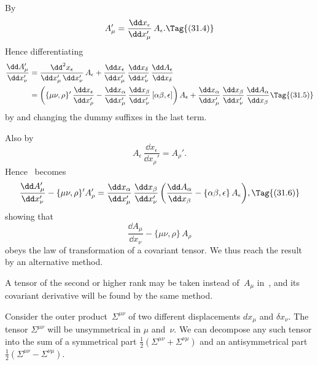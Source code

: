 \documentclass[12pt]{book}
\begin{document}
By~
\[
A_{\mu}' = \frac{\dd x_{\epsilon}}{\dd x_{\mu}'}\, A_{\epsilon}.
\Tag{(31.4)}
\]
Hence differentiating
\begin{align*}
  \frac{\dd A_{\mu}'}{\dd x_{\nu}'}
  &= \frac{\dd^{2} x_{\epsilon}}{\dd x_{\mu}'\, \dd x_{\nu}'}\, A_{\epsilon}
  + \frac{\dd x_{\epsilon}}{\dd x_{\mu}'}\,
    \frac{\dd x_{\delta}}{\dd x_{\nu}'}\,
    \frac{\dd A_{\epsilon}}{\dd x_{\delta}} \\
  &= \left(\{\mu\nu, \rho\}'\, \frac{\dd x_{\epsilon}}{\dd x_{\rho}'}
    - \frac{\dd x_{\alpha}}{\dd x_{\mu}'}\, \frac{\dd x_{\beta}}{\dd x_{\nu}'}\, [\alpha\beta, \epsilon]\right) A_{\epsilon}
    + \frac{\dd x_{\alpha}}{\dd x_{\mu}'}\, \frac{\dd x_{\beta}}{\dd x_{\nu}'}\, \frac{\dd A_{\alpha}}{\dd x_{\beta}}
\Tag{(31.5)}
\end{align*}
by  and changing the dummy suffixes in the last term.

Also by~
\[
A_{\epsilon}\, \frac{\dd x_{\epsilon}}{\dd x_{\rho}'} = A_{\rho}'.
\]
Hence ~becomes
\[
\frac{\dd A_{\mu}'}{\dd x_{\nu}'} - \{\mu\nu, \rho\}' A_{\rho}'
= \frac{\dd x_{\alpha}}{\dd x_{\mu}'}\, \frac{\dd x_{\beta}}{\dd x_{\nu}'} \left(\frac{\dd A_{\alpha}}{\dd x_{\beta}} - \{\alpha\beta, \epsilon\}\, A_{\epsilon}\right)\!,
\Tag{(31.6)}
\]
showing that
\[
\frac{\dd A_{\mu}}{\dd x_{\nu}} - \{\mu\nu, \rho\}\, A_{\rho}
\]
obeys the law of transformation of a covariant tensor. We thus reach the
result~ by an alternative method.

A tensor of the second or higher rank may be taken instead of~$A_{\mu}$ in~,
and its covariant derivative will be found by the same method.


{\Loosen Consider the outer product~$\Sigma^{\mu\nu}$ of two different displacements $dx_{\mu}$ and $\delta x_{\nu}$.
The tensor $\Sigma^{\mu\nu}$ will be unsymmetrical in $\mu$ and~$\nu$. We can decompose any
such tensor into the sum of a symmetrical part $\frac{1}{2}(\Sigma^{\mu\nu} + \Sigma^{\nu\mu})$ and an antisymmetrical
part $\frac{1}{2}(\Sigma^{\mu\nu} - \Sigma^{\nu\mu})$.}
\end{document}
